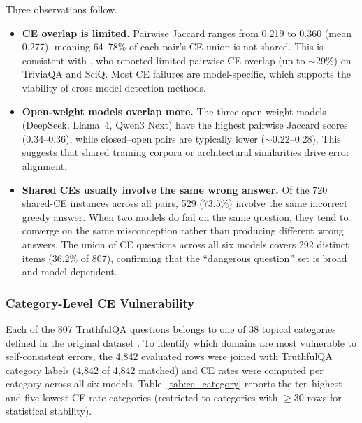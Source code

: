 \documentclass[12pt,twocolumn]{article}
\begin{document}
Three observations follow.
\begin{itemize}[nosep]
\item \textbf{CE overlap is limited.} Pairwise Jaccard ranges from
      0.219 to 0.360 (mean 0.277), meaning 64--78\% of each pair's CE
      union is not shared. This is consistent with
      \citet{tan2025consistent}, who reported limited pairwise CE
      overlap (up to ${\sim}$29\%) on TriviaQA and SciQ. Most CE
      failures are model-specific, which supports the viability of
      cross-model detection methods.
\item \textbf{Open-weight models overlap more.} The three
      open-weight models (DeepSeek, Llama~4, Qwen3 Next) have the
      highest pairwise Jaccard scores (0.34--0.36), while
      closed--open pairs are typically lower (${\sim}$0.22--0.28).
      This suggests that shared training corpora or architectural
      similarities drive error alignment.
\item \textbf{Shared CEs usually involve the same wrong answer.} Of
      the 720 shared-CE instances across all pairs, 529 (73.5\%)
      involve the same incorrect greedy answer. When two models do
      fail on the same question, they tend to converge on the same
      misconception rather than producing different wrong answers.
      The union of CE questions across all six models covers 292
      distinct items (36.2\% of 807), confirming that the
      ``dangerous question'' set is broad and model-dependent.
\end{itemize}

\subsubsection{Category-Level CE Vulnerability}

Each of the 807 TruthfulQA questions belongs to one of 38 topical
categories defined in the original dataset
\citep{lin2022truthfulqa}. To identify which domains are most
vulnerable to self-consistent errors, the 4,842 evaluated rows were
joined with TruthfulQA category labels (4,842 of 4,842 matched) and
CE rates were computed per category across all six models.
Table~\ref{tab:ce_category} reports the ten highest and five lowest
CE-rate categories (restricted to categories with $\geq 30$ rows
for statistical stability).
\end{document}
